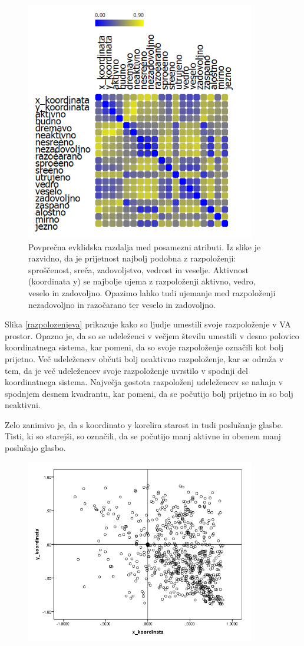 \documentclass[a4paper, 12pt]{book}
\begin{document}
{\begin{figure}[hbt]
\centering
\includegraphics[width=10cm]{images/korelacija.png}

\caption{Povprečna evklidska razdalja med posamezni atributi. Iz slike je razvidno, da je prijetnost najbolj podobna z razpoloženji: sproščenost, sreča, zadovoljstvo, vedrost in veselje. Aktivnost (koordinata y) se najbolje ujema z razpoloženji aktivno, vedro, veselo in zadovoljno. Opazimo lahko tudi ujemanje med razpoloženji nezadovoljno in razočarano ter veselo in zadovoljno.}
\label{prisotnost_kor}
\end{figure}

Slika \ref{razpolozenjeva} prikazuje kako so ljudje umestili svoje razpoloženje v VA prostor. Opazno je, da so se udeleženci v večjem številu umestili v desno polovico koordinatnega sistema, kar pomeni, da so svoje razpoloženje označili kot bolj prijetno. Več udeležencev občuti bolj neaktivno razpoloženje, kar se odraža v tem, da je več udeležencev svoje razpoloženje uvrstilo v spodnji del koordinatnega sistema. Največja gostota razpoloženj udeležencev se nahaja v spodnjem desnem kvadrantu, kar pomeni, da se počutijo bolj prijetno in so bolj neaktivni. 

Zelo zanimivo je, da s koordinato y korelira starost in tudi poslušanje glasbe. Tisti, ki so starejši, so označili, da se počutijo manj aktivne in obenem manj poslušajo glasbo. 

\begin{figure}[hbt]
\centering
\includegraphics[width=10cm]{images/vamood.png}


\end{figure}}
\end{document}
